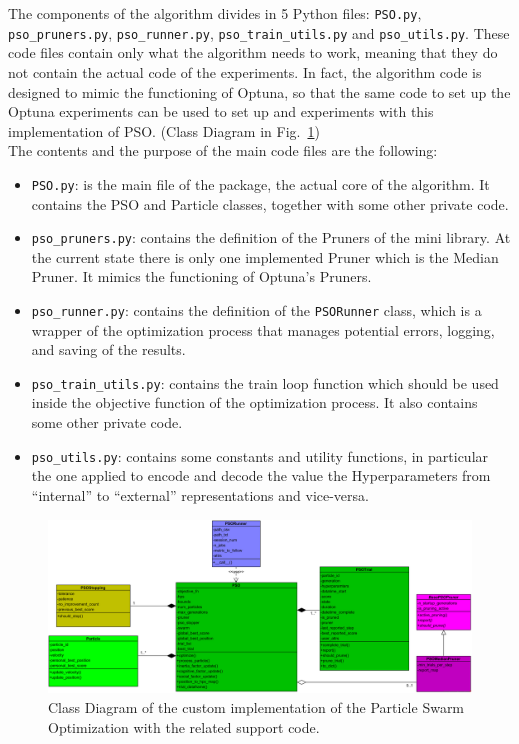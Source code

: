 The components of the algorithm divides in 5 Python files: \texttt{PSO.py}, \texttt{pso\_pruners.py}, \texttt{pso\_runner.py}, \texttt{pso\_train\_utils.py} and \texttt{pso\_utils.py}.
These code files contain only what the algorithm needs to work, meaning that they do not contain the actual code of the experiments. In fact, the algorithm code is designed to mimic the functioning of Optuna, so that the same code to set up the Optuna experiments can be used to set up and experiments with this implementation of PSO. (Class Diagram in Fig.~\ref{fig:figure-3.2.1})
% 
\\[0.3cm]The contents and the purpose of the main code files are the following:
\begin{itemize}[itemsep=0.1cm]
    \item \texttt{PSO.py}: is the main file of the package, the actual core of the algorithm. It contains the PSO and Particle classes, together with some other private code.
    \item \texttt{pso\_pruners.py}: contains the definition of the Pruners of the mini library. At the current state there is only one implemented Pruner which is the Median Pruner. It mimics the functioning of Optuna's Pruners.
    \item \texttt{pso\_runner.py}: contains the definition of the \texttt{PSORunner} class, which is a wrapper of the optimization process that manages potential errors, logging, and saving of the results.
    \item \texttt{pso\_train\_utils.py}: contains the train loop function which should be used inside the objective function of the optimization process. It also contains some other private code.
    \item \texttt{pso\_utils.py}: contains some constants and utility functions, in particular the one applied to encode and decode the value the Hyperparameters from “internal” to “external” representations and vice-versa.
\end{itemize}
\begin{figure}[t]
	\centering
	\includegraphics[width=15cm]{figures/figure-3.2.1.png}
	\caption[Class Diagram of Custom PSO Implementation]{Class Diagram of the custom implementation of the Particle Swarm Optimization with the related support code.}
	\label{fig:figure-3.2.1}
\end{figure}

